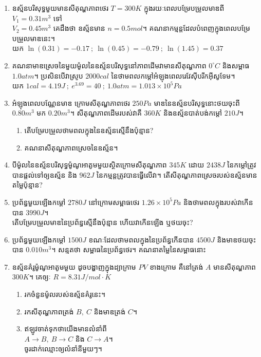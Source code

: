 \begin{enumerate}[m]
	\item ឧស្ម័នបរិសុទ្ធមួយមានសីតុណ្ហភាពថេរ $T=300K$ ក្នុងរយៈពេលបម្រែបម្រួលមាឌពី $V_{1}=0.31m^{3}$ ទៅ\\ $V_{2}=0.45m^{3}$ គេដឹងថា ឧស្ម័នមាន $n=0.5mol$។ គណនាកម្មន្តដែលបំពេញក្នុងពេលបម្រែបម្រួលមាឌនេះ។\\
	យក $\ln\left(0.31\right)=-0.17~;~\ln\left(0.45\right)=-0.79~;~\ln\left(1.45\right)=0.37$
	\item គណនាមាឌស្រេចនៃមួយម៉ូលនៃឧស្ម័នបរិសុទ្ធនៅភាពដើមវាមានសីតុណ្ហភាព $0^\circ C$ និងសម្ពាធ $1.0atm$។ ប្រសិនបើវាស្រូប $2000cal$ នៃថាមពលកម្តៅអំឡុងពេលរេវែសុីបរីកអុីសូទែម។\\
	យក $1cal=4.19J~;~e^{3.69}=40~;~1.0atm = 1.013\times10^{5}Pa$
	\item អំឡុងពេលបណ្ណែនមាឌ ក្រោមសីតុណ្ហភាពថេរ $250Pa$ មាឌនៃឧស្ម័នបរិសុទ្ធនោះថយចុះពី $0.80m^{3}$ មក $0.20m^{3}$។ សីតុណ្ហភាពដើមរបស់វាគឺ $360K$ និងឧស្ម័នបាត់បង់កម្តៅ $210J$។
	\begin{enumerate}[k]
		\item តើបម្រែបម្រួលថាមពលក្នុងនៃឧស្ម័នស្មើនឹងប៉ុន្មាន?
		\item គណនាសីតុណ្ហភាពស្រេចនៃឧស្ម័ន។
	\end{enumerate} 
	\item បីម៉ូលនៃឧស្ម័នបរិសុទ្ធម៉ូណូអាតូមមួយស្ថិតក្រោមសីតុណ្ហភាព $345K$ ដោយ $2438J$ នៃកម្តៅត្រូវបានផ្តល់ទៅឲ្យឧស្ម័ន និង $962J$ នៃកម្មន្តត្រូវបានធ្វើលើវា។ តើសីតុណ្ហភាពស្រេចរបស់ឧស្ម័នមានតម្លៃប៉ុន្មាន?
	\item ប្រព័ន្ធមួយឡើងកម្តៅ $2780J$ នៅក្រោមសម្ពាធថេរ $1.26\times10^{5}Pa$ និងថាមពលក្នុងរបស់វាកើនបាន $3990J$។\\ តើបម្រែបម្រួលមាឌនៃប្រព័ន្ធស្មើនឹងប៉ុន្មាន ហើយវាកើនឡើង ឬថយចុះ?
	\item ប្រព័ន្ធមួយឡើងកម្តៅ $1500J$ ខណៈដែលថាមពលក្នុងនៃប្រព័ន្ធកើនបាន $4500J$ និងមាឌថយចុះបាន $0.010m^{3}$។ សន្មតថា សម្ពាធនៃប្រព័ន្ធថេរ។ គណនាតម្លៃនៃសម្ពាធនោះ
	\item ឧស្ម័នគំរូម៉ូណូអាតូមមួយ ដូចបង្ហាញក្នុងដ្យាក្រាម $PV$ ខាងក្រោម គឺនៅត្រង់ $A$ មានសីតុណ្ហភាព $300K$។ គេឲ្យៈ $R=8.31J/mol\cdot K$
	\begin{multicols}{2}
		\begin{enumerate}[k]
			\item រកចំនួនម៉ូលរបស់ឧស្ម័នគំរូនេះ។
			\item រកសីតុណ្ហភាពត្រង់ $B,~C$ និងមាឌត្រង់ $C$។
			\item ឥឡូវចាត់ទុកថាយើងមានលំនាំពី\\ $A\rightarrow B,~B\rightarrow C$ និង $C\rightarrow A$។\\ ចូរដាក់ឈ្មោះឲ្យលំនាំនីមួយៗ។

\end{enumerate}
\end{multicols}
\end{enumerate}
